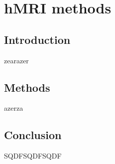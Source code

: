 %


\chapter{hMRI methods}
\label{chap:hMRI_meth}
\minitoc

\section{Introduction}

zearazer

\section{Methods}

azerza

\section{Conclusion}

SQDFSQDFSQDF